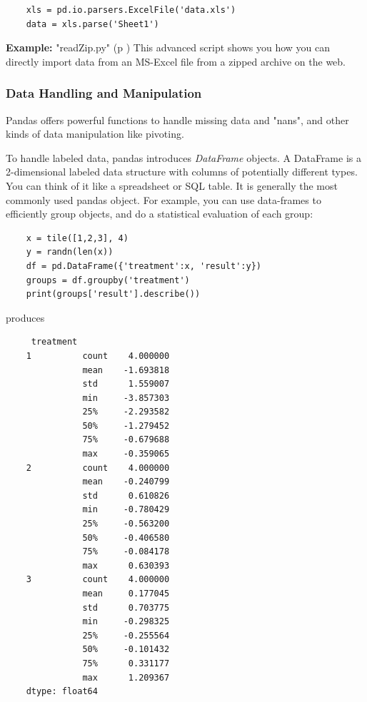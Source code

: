 \begin{lstlisting}
    xls = pd.io.parsers.ExcelFile('data.xls')
    data = xls.parse('Sheet1')
\end{lstlisting}

\textbf{Example: }
\PyImg "readZip.py" (p \pageref{py:readZip}) This advanced script shows you how you can directly import data from an MS-Excel file from a zipped archive on the web.

\subsubsection{Data Handling and Manipulation}
Pandas offers powerful functions to handle missing data and "nans", and other kinds of data manipulation like pivoting.

To handle labeled data, pandas introduces \emph{DataFrame} objects. A DataFrame is a 2-dimensional labeled data structure with columns of potentially different types. You can think of it like a spreadsheet or SQL table. It is generally the most commonly used pandas object. For example, you can use data-frames to efficiently group objects, and do a statistical evaluation of each group:

\begin{lstlisting}
    x = tile([1,2,3], 4)
    y = randn(len(x))
    df = pd.DataFrame({'treatment':x, 'result':y})
    groups = df.groupby('treatment')
    print(groups['result'].describe())
\end{lstlisting}

produces

\begin{lstlisting}
     treatment
    1          count    4.000000
               mean    -1.693818
               std      1.559007
               min     -3.857303
               25%     -2.293582
               50%     -1.279452
               75%     -0.679688
               max     -0.359065
    2          count    4.000000
               mean    -0.240799
               std      0.610826
               min     -0.780429
               25%     -0.563200
               50%     -0.406580
               75%     -0.084178
               max      0.630393
    3          count    4.000000
               mean     0.177045
               std      0.703775
               min     -0.298325
               25%     -0.255564
               50%     -0.101432
               75%      0.331177
               max      1.209367
    dtype: float64
\end{lstlisting}

